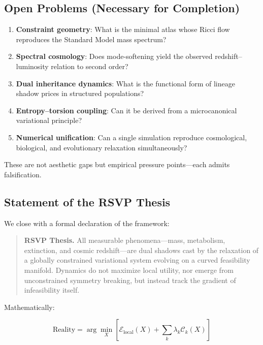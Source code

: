 \documentclass[11pt,a4paper]{article}
\begin{document}
\subsection{Open Problems (Necessary for Completion)}

\begin{enumerate}
    \item \textbf{Constraint geometry}: What is the minimal atlas whose Ricci flow reproduces the Standard Model mass spectrum?
    \item \textbf{Spectral cosmology}: Does mode-softening yield the observed redshift–luminosity relation to second order?
    \item \textbf{Dual inheritance dynamics}: What is the functional form of lineage shadow prices in structured populations?
    \item \textbf{Entropy–torsion coupling}: Can it be derived from a microcanonical variational principle?
    \item \textbf{Numerical unification}: Can a single simulation reproduce cosmological, biological, and evolutionary relaxation simultaneously?
\end{enumerate}

These are not aesthetic gaps but empirical pressure points—each admits falsification.

\subsection{Statement of the RSVP Thesis}

We close with a formal declaration of the framework:

\begin{quote}
\textbf{RSVP Thesis.}  
All measurable phenomena—mass, metabolism, extinction, and cosmic redshift—are dual shadows cast by the relaxation of a globally constrained variational system evolving on a curved feasibility manifold. Dynamics do not maximize local utility, nor emerge from unconstrained symmetry breaking, but instead track the gradient of infeasibility itself.
\end{quote}

Mathematically:

\begin{equation}
\text{Reality} = \arg\min_X \left[\mathcal{E}_{\text{local}}(X) + \sum_k \lambda_k \mathcal{C}_k(X) \right]
\end{equation}
\end{document}
